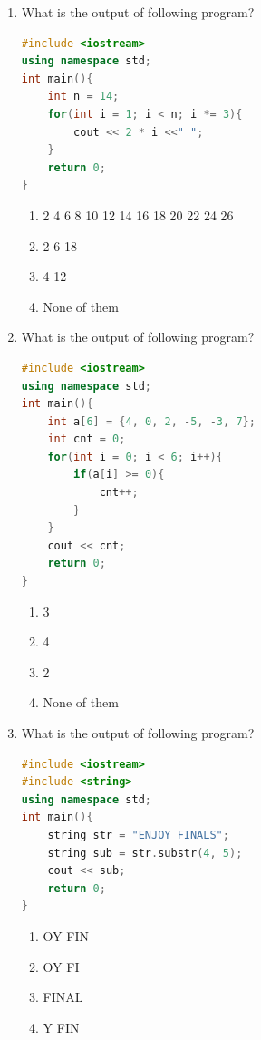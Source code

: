 \documentclass[10pt]{article}
\begin{document}
\begin{enumerate}
\item What is the output of following program?
\begin{lstlisting}[language=C++]
#include <iostream>
using namespace std;
int main(){
    int n = 14;
    for(int i = 1; i < n; i *= 3){
	    cout << 2 * i <<" ";   
    }
    return 0;
}
\end{lstlisting}
\begin{enumerate}
    \item 2 4 6 8 10 12 14 16 18 20 22 24 26
    \item 2 6 18 
    \item 4 12
    \item None of them
\end{enumerate}



\item What is the output of following program?
\begin{lstlisting}[language=C++]
#include <iostream>
using namespace std;
int main(){
    int a[6] = {4, 0, 2, -5, -3, 7};
    int cnt = 0;
    for(int i = 0; i < 6; i++){
        if(a[i] >= 0){
            cnt++;
        }
    }
    cout << cnt;
    return 0;
}
\end{lstlisting}
\begin{multicols}{4}
\begin{enumerate}
    \item 3
    \item 4 
    \item 2
    \item None of them
\end{enumerate}
\end{multicols}



\item What is the output of following program?
\begin{lstlisting}[language=C++]
#include <iostream>
#include <string>
using namespace std;
int main(){
    string str = "ENJOY FINALS";
    string sub = str.substr(4, 5);
    cout << sub;
    return 0;
}
\end{lstlisting}
\begin{multicols}{4}
\begin{enumerate}
    \item OY FIN
    \item OY FI
    \item FINAL
    \item Y FIN
\end{enumerate}
\end{multicols}




\end{enumerate}
\end{document}
